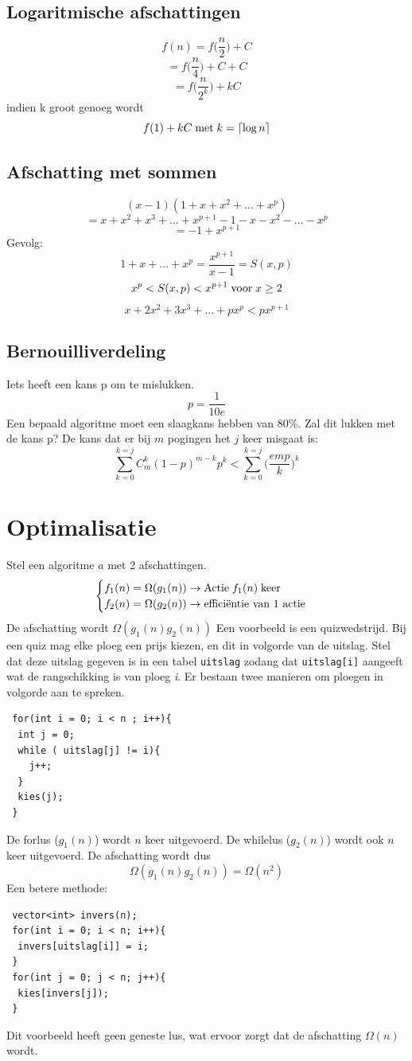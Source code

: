 \documentclass[12pt]{report}
\def\lc{\left\lceil}
\def\rc{\right\rceil}
\begin{document}
\subsection{Logaritmische afschattingen}
$$f(n) = f\bigg(\frac{n}{2}\bigg) + C$$
$$= f\bigg(\frac{n}{4}\bigg) + C + C$$
$$= f\bigg(\frac{n}{2^k}\bigg) + kC$$
indien k groot genoeg wordt
$$f(1) + kC\; \hbox{met}\; k = \lc\log n \rc$$
\subsection{Afschatting met sommen}
$$(x - 1)(1 + x + x^2 + ... + x^p)$$
$$= x + x^2 + x^3 + ... + x^{p + 1} - 1 - x - x^2 - ... - x^p$$
$$= - 1 + x^{p + 1}$$
Gevolg:
$$1 + x + ... + x^p = \frac{x^{p + 1}}{x-1} = S(x, p)$$
$$x^p < S(x, p) < x^{p + 1} \; \hbox{voor}\; x \geq 2$$
$$x + 2x^2 + 3x^3 + ... + px^p < px^{p + 1}$$
\subsection{Bernouilliverdeling}
Iets heeft een kans p om te mislukken.
$$p = \frac{1}{10e}$$
Een bepaald algoritme moet een slaagkans hebben van 80\%. Zal dit lukken met de kans p?
De kans dat er bij $m$ pogingen het $j$ keer misgaat is:
$$\sum_{k=0}^{k=j}C^{k}_{m}(1 - p)^{m-k}p^k < \sum_{k=0}^{k=j}\bigg(\frac{emp}{k}\bigg)^k$$
\section{Optimalisatie}
Stel een algoritme $a$ met 2 afschattingen.
$$
  \begin{cases}
    f_1(n) = \Omega(g_1(n)) \rightarrow \hbox{Actie}\; f_1(n)\; \hbox{keer}\\
    f_2(n) = \Omega(g_2(n)) \rightarrow \hbox{efficiëntie van 1 actie}\\
  \end{cases}
$$
De afschatting wordt $\Omega(g_1(n)g_2(n))$
Een voorbeeld is een quizwedstrijd. Bij een quiz mag elke ploeg een prijs kiezen, en dit in volgorde van de uitslag. Stel dat deze uitslag gegeven is in een tabel \texttt{uitslag} zodang dat \texttt{uitslag[i]} aangeeft wat de rangschikking is van ploeg \textit{i}. Er bestaan twee manieren om ploegen in volgorde aan te spreken.
\begin{lstlisting}
 for(int i = 0; i < n ; i++){
  int j = 0;
  while ( uitslag[j] != i){
    j++;
  }
  kies(j);
 }
\end{lstlisting}
De forlus ($g_1(n)$) wordt $n$ keer uitgevoerd. De whilelus ($g_2(n)$) wordt ook $n$ keer uitgevoerd. De afschatting wordt dus
$$\Omega(g_1(n)g_2(n)) = \Omega(n^2)$$
Een betere methode:
\begin{lstlisting}
 vector<int> invers(n);
 for(int i = 0; i < n; i++){
  invers[uitslag[i]] = i;
 }
 for(int j = 0; j < n; j++){
  kies[invers[j]);
 }
\end{lstlisting}
Dit voorbeeld heeft geen geneste lus, wat ervoor zorgt dat de afschatting $\Omega(n)$ wordt.
\end{document}
